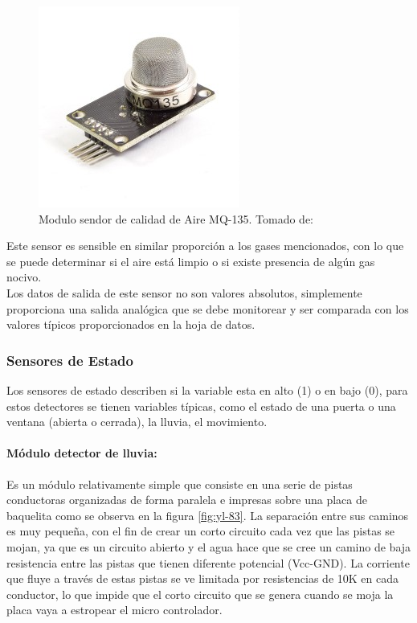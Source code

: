 \begin{figure}[H]
	\centering
	\caption{Modulo sendor de calidad de Aire MQ-135. Tomado de: \cite{MQ1}}
	\label{fig:sensor-calidad-aire-mq135}
 	\includegraphics[width=0.35\linewidth]{Imagenes/sensor-calidad-aire-mq135}
\end{figure}

Este sensor es sensible en similar proporción a los gases mencionados, con lo que se puede determinar si el aire está limpio o si existe presencia de algún gas nocivo.\\

Los datos de salida de este sensor no son valores absolutos, simplemente proporciona una salida analógica que se debe monitorear y ser comparada con los valores típicos proporcionados en la hoja de datos.\cite{MQ2}

\subsubsection{Sensores de Estado}

Los sensores de estado describen si la variable esta en alto (1) o en bajo (0), para estos detectores se tienen variables típicas, como el estado de una puerta o una ventana (abierta o cerrada), la lluvia, el movimiento.

\paragraph{Módulo detector de lluvia: }

Es un módulo relativamente simple que consiste en una serie de pistas conductoras organizadas de forma paralela e impresas sobre una placa de baquelita como se observa en la figura \ref{fig:yl-83}. La separación entre sus caminos es muy pequeña, con el fin de crear un corto circuito cada vez que las pistas se mojan, ya que es un circuito abierto y el agua hace que se cree un camino de baja resistencia entre las pistas que tienen diferente potencial (Vcc-GND). La corriente que fluye a través de estas pistas se ve limitada por resistencias de 10K en cada conductor, lo que impide que el corto circuito que se genera cuando se moja la placa vaya a estropear el micro controlador.\cite{LLU}

